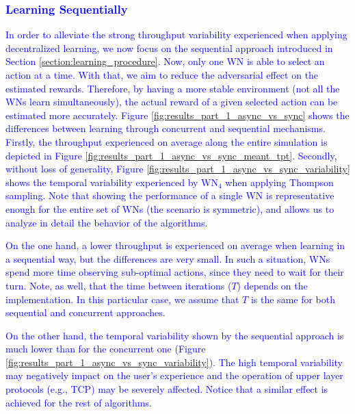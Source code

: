 \documentclass[preprint,12pt]{elsarticle}
\begin{document}
	\textcolor{blue}{\subsubsection{Learning Sequentially}}
	\label{section:proposed_method}
	
	\textcolor{blue}{In order to alleviate the strong throughput variability experienced when applying decentralized learning, we now focus on the sequential approach introduced in Section \ref{section:learning_procedure}. Now, only one WN is able to select an action at a time. With that, we aim to reduce the adversarial effect on the estimated rewards. Therefore, by having a more stable environment (not all the WNs learn simultaneously), the actual reward of a given selected action can be estimated more accurately. Figure \ref{fig:results_part_1_async_vs_sync} shows the differences between learning through concurrent and sequential mechanisms. Firstly, the throughput experienced on average along the entire simulation is depicted in Figure \ref{fig:results_part_1_async_vs_sync_meant_tpt}. Secondly, without loss of generality, Figure \ref{fig:results_part_1_async_vs_sync_variability} shows the temporal variability experienced by $\text{WN}_4$ when applying Thompson sampling. Note that showing the performance of a single WN is representative enough for the entire set of WNs (the scenario is symmetric), and allows us to analyze in detail the behavior of the algorithms.}
	
	\textcolor{blue}{On the one hand, a lower throughput is experienced on average when learning in a sequential way, but the differences are very small. In such a situation, WNs spend more time observing sub-optimal actions, since they need to wait for their turn. Note, as well, that the time between iterations ($T$) depends on the implementation. In this particular case, we assume that $T$ is the same for both sequential and concurrent approaches.}
	
	\textcolor{blue}{On the other hand, the temporal variability shown by the sequential approach is much lower than for the concurrent one (Figure \ref{fig:results_part_1_async_vs_sync_variability}). The high temporal variability may negatively impact on the user's experience and the operation of upper layer protocols (e.g., TCP) may be severely affected. Notice that a similar effect is achieved for the rest of algorithms.}
	
\end{document}
